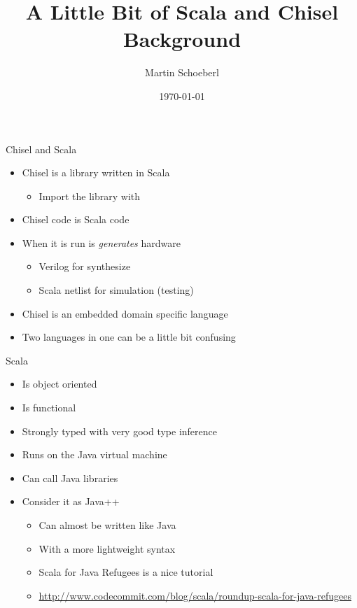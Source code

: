 

\newif\ifbook


\title{A Little Bit of Scala and Chisel Background}
\author{Martin Schoeberl}
\date{\today}



\begin{frame}
\titlepage
\end{frame}

\begin{frame}[fragile]{Chisel and Scala}
\begin{itemize}
\item Chisel is a library written in Scala
\begin{itemize}
\item Import the library with 
\end{itemize}
\item Chisel code is Scala code
\item When it is run is \emph{generates} hardware
\begin{itemize}
\item Verilog for synthesize
\item Scala netlist for simulation (testing)
\end{itemize}
\item Chisel is an embedded domain specific language
\item Two languages in one can be a little bit confusing
\end{itemize}
\end{frame}

\begin{frame}[fragile]{Scala}
\begin{itemize}
\item Is object oriented
\item Is functional
\item Strongly typed with very good type inference
\item Runs on the Java virtual machine
\item Can call Java libraries
\item Consider it as Java++
\begin{itemize}
\item Can almost be written like Java
\item With a more lightweight syntax
\item Scala for Java Refugees is a nice tutorial
\item \url{http://www.codecommit.com/blog/scala/roundup-scala-for-java-refugees}
\end{itemize}
\end{itemize}
\end{frame}

